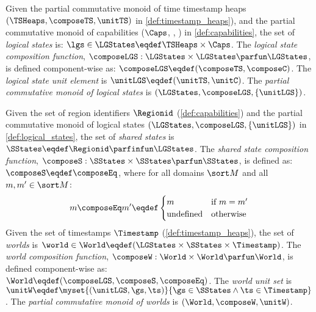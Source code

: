 \begin{definition}\label{def:logical_states}
Given the partial commutative monoid of time timestamp heaps $(\TSHeaps, \composeTS, \unitTS)$ in \ref{def:timestamp_heaps}), and the partial commutative monoid of capabilities ($\Caps$, \composeC, \unitC) in \ref{def:capabilities}, the set of \emph{logical states} is: $\lgs \in \LGStates \eqdef \TSHeaps \times \Caps$. 
The \emph{logical state composition function}, $\composeLGS: \LGStates \times \LGStates \parfun \LGStates$, is defined component-wise as: $\composeLGS \eqdef (\composeTS, \composeC)$.
The \emph{logical state unit element} is $\unitLGS \eqdef (\unitTS, \unitC)$.
The \emph{partial commutative monoid of logical states} is $(\LGStates, \composeLGS, \{\unitLGS\})$.
%
\end{definition}
\begin{definition}[Worlds]
Given the set of region identifiers $\Regionid$ (\ref{def:capabilities}) and the partial commutative monoid of logical states $(\LGStates, \composeLGS, \{\unitLGS\})$ in \ref{def:logical_states}, the set of \emph{shared states} is $\SStates \eqdef \Regionid \parfinfun \LGStates$.
The \emph{shared state composition function}, $\composeS: \SStates \times \SStates \parfun \SStates$, is defined as: $\composeS \eqdef \composeEq$, where for all domains $\sort M$ and all $m, m' \in \sort M$: 
%
\[
	m \composeEq m' \eqdef 
	\begin{cases}
		m & \text{if } m = m'\\
		\text{undefined} & \text{otherwise}
	\end{cases}
\]
%
Given the set of timestamps $\Timestamp$ (\ref{def:timestamp_heaps}), the set of \emph{worlds} is $\world \in \World \eqdef (\LGStates \times \SStates \times \Timestamp)$. 
The \emph{world composition function}, $\composeW: \World \times \World \parfun \World$, is defined component-wise as: $\World \eqdef (\composeLGS, \composeS, \composeEq)$.
The \emph{world unit set} is $\unitW \eqdef \myset{(\unitLGS, \gs, \ts)}{\gs \in \SStates \land \ts \in \Timestamp}$.
The \emph{partial commutative monoid of worlds} is $(\World, \composeW, \unitW)$.
\end{definition}
%
%
